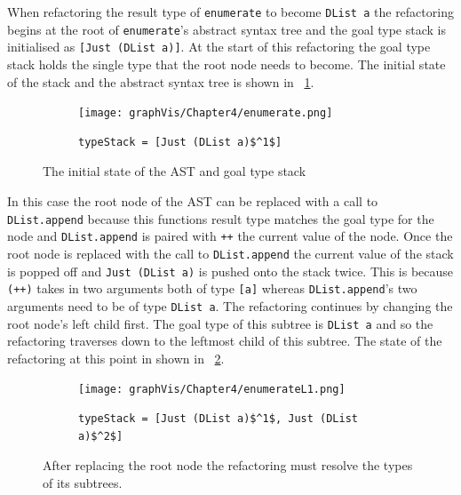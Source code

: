 When refactoring the result type of \texttt{enumerate} to become \texttt{DList a} the refactoring begins at the root of \texttt{enumerate}'s abstract syntax tree and the goal type stack is initialised as \texttt{[Just (DList a)]}. At the start of this refactoring the goal type stack holds the single type that the root node needs to become. The initial state of the stack and the abstract syntax tree is shown in \DIFdelbegin {}\DIFdelend \DIFaddbegin {}\DIFaddend ~\ref{initASTStack}.

\begin{figure}[t]
	\begin{subfigure}{\linewidth}
		\texttt{[image: graphVis/Chapter4/enumerate.png]}
	\end{subfigure}\par\medskip

	\begin{subfigure}{\linewidth}
		\begin{lstlisting}[mathescape]
			typeStack = [Just (DList a)$^1$]
		\end{lstlisting}
	\end{subfigure}\par\medskip
\caption{The initial state of the AST and goal type stack}
\label{initASTStack}
\end{figure} 

In this case the root node of the AST can be replaced with a call to \texttt{DList.append} because this functions result type matches the goal type for the node and \texttt{DList.append} is paired with \texttt{++} the current value of the node. Once the root node is replaced with the call to \texttt{DList.append} the current value of the stack is popped off and \texttt{Just (DList a)} is pushed onto the stack twice. This is because \texttt{(++)} takes in two arguments both of type \texttt{[a]} whereas \texttt{DList.append}'s two arguments need to be of type \texttt{DList a}. The refactoring continues by changing the root node's left child first. The goal type of this subtree is \texttt{DList a} and so the refactoring traverses down to the leftmost child of this subtree. The state of the refactoring at this point in shown in \DIFdelbegin {}\DIFdelend \DIFaddbegin {}\DIFaddend ~\ref{enumStateL1}.

\begin{figure}[t]
	\begin{subfigure}{\linewidth}
		\texttt{[image: graphVis/Chapter4/enumerateL1.png]}
	\end{subfigure}\par\medskip

	\begin{subfigure}{\linewidth}
		\begin{lstlisting}[mathescape]
			typeStack = [Just (DList a)$^1$, Just (DList a)$^2$]
		\end{lstlisting}
	\end{subfigure}\par\medskip
\caption{After replacing the root node the refactoring must resolve the types of its subtrees.}
\label{enumStateL1}
\end{figure} 

